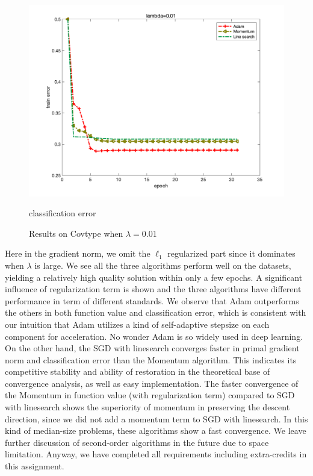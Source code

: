 \documentclass{article}
\begin{document}
\begin{figure}[H]
\begin{minipage}{0.33\linewidth}
		\includegraphics[width=1\linewidth]{./fig/err_c4}
		\caption{classification error}
	\end{minipage}
	\caption*{Results on Covtype when $\lambda=0.01$}
\end{figure}
Here in the gradient norm, we omit the $\ell_1$ regularized part since it dominates when $\lambda$ is large. We see all the three algorithms perform well on the datasets, yielding a relatively high quality solution within only a few epochs. A significant influence of regularization term is shown and the three algorithms have different performance in term of different standards. We observe that Adam outperforms the others in both function value and classification error, which is consistent with our intuition that Adam utilizes a kind of self-adaptive stepsize on each component for acceleration. No wonder Adam is so widely used in deep learning. On the other hand, the SGD with linesearch converges faster in primal gradient norm and classification error than the Momentum algorithm. This indicates its competitive stability and ability of restoration in the theoretical base of convergence analysis, as well as easy implementation. The faster convergence of the Momentum in function value (with regularization term) compared to SGD with linesearch shows the superiority of momentum in preserving the descent direction, since we did not add a momentum term to SGD with linesearch. In this kind of median-size problems, these algorithms show a fast convergence. We leave further discussion of second-order algorithms in the future due to space limitation. Anyway, we have completed all requirements including extra-credits in this assignment.
  

\end{document}
